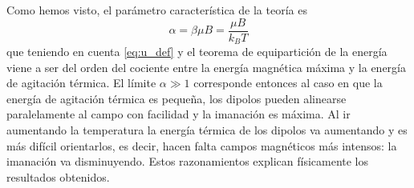 Como hemos visto, el parámetro característica de la teoría es
$$\alpha = \beta\mu B = \frac{\mu B}{k_B T}$$
que teniendo en cuenta \eqref{eq:u_def} y el teorema de equipartición de la energía viene a ser del orden del cociente entre la energía magnética máxima y la energía de agitación térmica.
El límite $\alpha \gg 1$ corresponde entonces al caso en que la energía de agitación térmica es pequeña, los dipolos pueden alinearse paralelamente al campo con facilidad y la imanación es máxima.
Al ir aumentando la temperatura la energía térmica de los dipolos va aumentando y es más difícil orientarlos, es decir, hacen falta campos magnéticos más intensos: la imanación va disminuyendo.
Estos razonamientos explican físicamente los resultados obtenidos.
